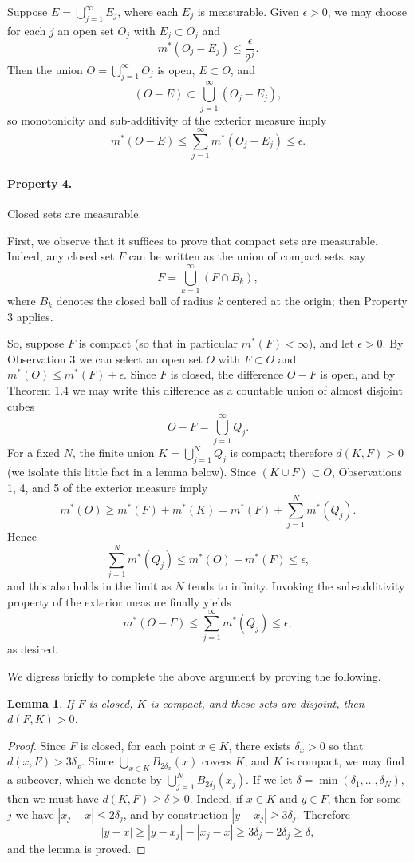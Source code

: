 \documentclass[11pt,openany]{book}
\newtheorem{lemma}[theorem]{Lemma}
\begin{document}
Suppose $E=\bigcup_{j=1}^{\infty}E_j$, where each $E_j$ is measurable. Given $\epsilon>0$, we may choose for each $j$ an open set $O_j$ with $E_j\subset O_j$ and
\[
 m^*(O_j-E_j)\le\frac{\epsilon}{2^j}.
\]
Then the union $O=\bigcup_{j=1}^{\infty}O_j$ is open, $E\subset O$, and
\[
 (O-E)\subset\bigcup_{j=1}^{\infty}(O_j-E_j),
\]
so monotonicity and sub-additivity of the exterior measure imply
\[
 m^*(O-E)\le\sum_{j=1}^{\infty}m^*(O_j-E_j)\le\epsilon.
\]

\paragraph{Property 4.} Closed sets are measurable.

First, we observe that it suffices to prove that compact sets are measurable. Indeed, any closed set $F$ can be written as the union of compact sets, say
\[
 F=\bigcup_{k=1}^{\infty}(F\cap B_k),
\]
where $B_k$ denotes the closed ball of radius $k$ centered at the origin; then Property 3 applies.

So, suppose $F$ is compact (so that in particular $m^*(F)<\infty$), and let $\epsilon>0$. By Observation 3 we can select an open set $O$ with $F\subset O$ and $m^*(O)\le m^*(F)+\epsilon$. Since $F$ is closed, the difference $O-F$ is open, and by Theorem 1.4 we may write this difference as a countable union of almost disjoint cubes
\[
 O-F=\bigcup_{j=1}^{\infty}Q_j.
\]
For a fixed $N$, the finite union $K=\bigcup_{j=1}^NQ_j$ is compact; therefore $d(K,F)>0$ (we isolate this little fact in a lemma below). Since $(K\cup F)\subset O$, Observations 1, 4, and 5 of the exterior measure imply
\[
 m^*(O)\ge m^*(F)+m^*(K)
 =m^*(F)+\sum_{j=1}^N m^*(Q_j).
\]
Hence
\[
 \sum_{j=1}^N m^*(Q_j)\le m^*(O)-m^*(F)\le\epsilon,
\]
and this also holds in the limit as $N$ tends to infinity. Invoking the sub-additivity property of the exterior measure finally yields
\[
 m^*(O-F)\le\sum_{j=1}^{\infty}m^*(Q_j)\le\epsilon,
\]
as desired.

We digress briefly to complete the above argument by proving the following.

\begin{lemma}
If $F$ is closed, $K$ is compact, and these sets are disjoint, then $d(F,K)>0$.
\end{lemma}

\begin{proof}
Since $F$ is closed, for each point $x\in K$, there exists $\delta_x>0$ so that $d(x,F)>3\delta_x$. Since $\bigcup_{x\in K}B_{2\delta_x}(x)$ covers $K$, and $K$ is compact, we may find a subcover, which we denote by $\bigcup_{j=1}^N B_{2\delta_j}(x_j)$. If we let $\delta=\min(\delta_1,\ldots,\delta_N)$, then we must have $d(K,F)\ge\delta>0$. Indeed, if $x\in K$ and $y\in F$, then for some $j$ we have $|x_j-x|\le2\delta_j$, and by construction $|y-x_j|\ge3\delta_j$. Therefore
\[
 |y-x|\ge |y-x_j|-|x_j-x|\ge3\delta_j-2\delta_j\ge\delta,
\]
and the lemma is proved.
\end{proof}
\end{document}
